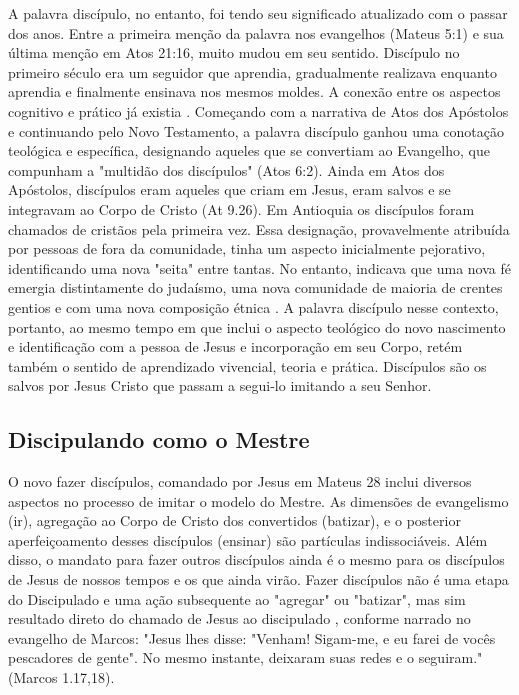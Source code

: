 \documentclass[12pt,openright,oneside,a4paper,
english,french,spanish,brazil]{abntex2}
\begin{document}
A palavra discípulo, no entanto, foi tendo seu significado atualizado com o passar dos anos. Entre a primeira menção da palavra nos evangelhos (Mateus 5:1) e sua última menção em Atos 21:16, muito mudou em seu sentido. Discípulo no primeiro século era um seguidor que aprendia, gradualmente realizava enquanto aprendia e finalmente ensinava nos mesmos moldes. A conexão entre os aspectos cognitivo e prático já existia \cite[p. 105]{wilkins}. Começando com a narrativa de Atos dos Apóstolos e continuando pelo Novo Testamento, a palavra discípulo ganhou uma conotação teológica e específica, designando aqueles que se convertiam ao Evangelho, que compunham a "multidão dos discípulos" (Atos 6:2). Ainda em Atos dos Apóstolos, discípulos eram aqueles que criam em Jesus, eram salvos e se integravam ao Corpo de Cristo (At 9.26)\cite[p. 59-60]{brandao}. Em Antioquia os discípulos foram chamados de cristãos pela primeira vez. Essa designação, provavelmente atribuída por pessoas de fora da comunidade, tinha um aspecto inicialmente pejorativo, identificando uma nova "seita" entre tantas. No entanto, indicava que uma nova fé emergia distintamente do judaísmo, uma nova comunidade de maioria de crentes gentios e com uma nova composição étnica \cite[p. 90]{wan_diaspora_2011}. A palavra discípulo nesse contexto, portanto, ao mesmo tempo em que inclui o aspecto teológico do novo nascimento e identificação com a pessoa de Jesus e incorporação em seu Corpo, retém também o sentido de aprendizado vivencial, teoria e prática. Discípulos são os salvos por Jesus Cristo que passam a segui-lo imitando a seu Senhor.

\subsection{Discipulando como o Mestre}


O novo fazer discípulos, comandado por Jesus em Mateus 28 inclui diversos aspectos no processo de imitar o modelo do Mestre. As dimensões de evangelismo (ir), agregação ao Corpo de Cristo dos convertidos (batizar), e o posterior aperfeiçoamento desses discípulos (ensinar) são partículas indissociáveis. Além disso, o mandato para fazer outros discípulos ainda é o mesmo para os discípulos de Jesus de nossos tempos e os que ainda virão. Fazer discípulos não é uma etapa do Discipulado e uma ação subsequente ao "agregar" ou "batizar", mas sim resultado direto do chamado de Jesus ao discipulado \cite[p. 64]{brandao}, conforme narrado no evangelho de Marcos: "Jesus lhes disse: "Venham! Sigam-me, e eu farei de vocês pescadores de gente". No mesmo instante, deixaram suas redes e o seguiram."(Marcos 1.17,18).
\end{document}
